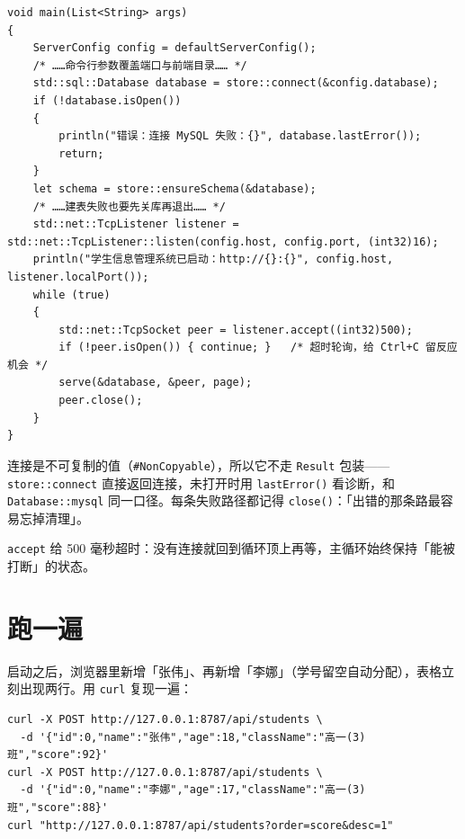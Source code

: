 \par
\medskip
\begin{lstlisting}[style=chali]
void main(List<String> args)
{
    ServerConfig config = defaultServerConfig();
    /* ……命令行参数覆盖端口与前端目录…… */
    std::sql::Database database = store::connect(&config.database);
    if (!database.isOpen())
    {
        println("错误：连接 MySQL 失败：{}", database.lastError());
        return;
    }
    let schema = store::ensureSchema(&database);
    /* ……建表失败也要先关库再退出…… */
    std::net::TcpListener listener = std::net::TcpListener::listen(config.host, config.port, (int32)16);
    println("学生信息管理系统已启动：http://{}:{}", config.host, listener.localPort());
    while (true)
    {
        std::net::TcpSocket peer = listener.accept((int32)500);
        if (!peer.isOpen()) { continue; }   /* 超时轮询，给 Ctrl+C 留反应机会 */
        serve(&database, &peer, page);
        peer.close();
    }
}
\end{lstlisting}
\par
\medskip

连接是不可复制的值（\texttt{\#Non\allowbreak{}Copyable}），所以它不走 \texttt{Result} 包装——\texttt{store:\allowbreak{}:\allowbreak{}connect} 直接返回连接，未打开时用 \texttt{last\allowbreak{}Error(\allowbreak{})\allowbreak{}} 看诊断，和 \texttt{Database:\allowbreak{}:\allowbreak{}mysql} 同一口径。每条失败路径都记得 \texttt{close(\allowbreak{})\allowbreak{}}：「出错的那条路最容易忘掉清理」。

\texttt{accept} 给 500 毫秒超时：没有连接就回到循环顶上再等，主循环始终保持「能被打断」的状态。

\section{跑一遍}

启动之后，浏览器里新增「张伟」、再新增「李娜」（学号留空自动分配），表格立刻出现两行。用 \texttt{curl} 复现一遍：

\par
\medskip
\begin{lstlisting}[style=sh]
curl -X POST http://127.0.0.1:8787/api/students \
  -d '{"id":0,"name":"张伟","age":18,"className":"高一(3)班","score":92}'
curl -X POST http://127.0.0.1:8787/api/students \
  -d '{"id":0,"name":"李娜","age":17,"className":"高一(3)班","score":88}'
curl "http://127.0.0.1:8787/api/students?order=score&desc=1"
\end{lstlisting}
\par
\medskip

